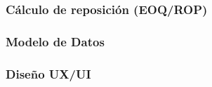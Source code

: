 \subsubsection{Cálculo de reposición (EOQ/ROP)}\label{sec:reposicion}


\subsubsection{Modelo de Datos}\label{sec:modelo_datos}


\subsubsection{Diseño UX/UI}
